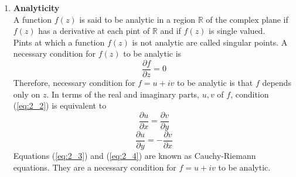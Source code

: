 \documentclass[11pt]{report}
\newcommand{\refn}[1]{(\ref{#1})}
\newcommand{\refx}[1]{\refn{eq:#1}}
\newcommand{\bt}[1]{\textbf{#1}}
\newcommand{\real}{ \mathbb{R}}
\begin{document}
\begin{enumerate}
		\item\bt{Analyticity}\\
		A function $f(z)$ is said to be analytic in a region $\real$ of the complex plane if $f(z)$ has a derivative at each pint of  $\real$ and if $f(z)$ is single valued.\\
		Pints at which a function $f(z)$ is not analytic are called singular points. A necessary condition for $f(z)$ to be analytic is
		\begin{equation}
			\frac{\partial f}{\partial z}=0
			\label{eq:2_2}
		\end{equation}
		Therefore, necessary condition for $f=u+iv$ to be analytic is that $f$ depends only on $z$. In terms of the real and imaginary parts, $u,v$ of $f$, condition \refx{2_2} is equivalent to
		\begin{equation}
			\frac{\partial u}{\partial x}=\frac{\partial v}{\partial y}
			\label{eq:2_3}
		\end{equation}
		\begin{equation}
			\frac{\partial u}{\partial y}=-\frac{\partial 	v}{\partial x}
			\label{eq:2_4}
		\end{equation}
		Equations \refx{2_3} and \refx{2_4} are known as Cauchy-Riemann equations. They are a necessary condition for $f=u+iv$ to be analytic.
	\end{enumerate}
	
\end{document}
